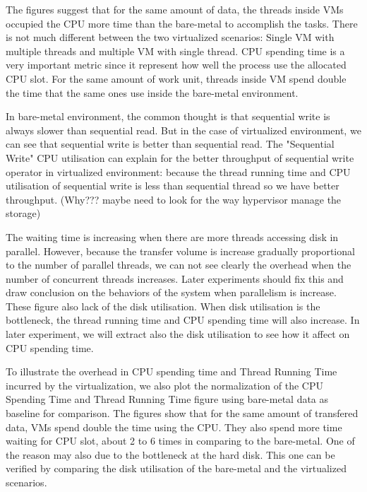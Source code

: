 \documentclass{acmsig}
\begin{document}
The figures suggest that for the same amount of data, the threads inside VMs occupied the CPU more time than the bare-metal to accomplish the tasks. There is not much different between the two virtualized scenarios: Single VM with multiple threads and multiple VM with single thread. CPU spending time is a very important metric since it represent how well the process use the allocated CPU slot. For the same amount of work unit, threads inside VM spend double the time that the same ones use inside the bare-metal environment.

In bare-metal environment, the common thought is that sequential write is always slower than sequential read. But in the case of virtualized environment, we can see that sequential write is better than sequential read. The "Sequential Write" CPU utilisation can explain for the better throughput of sequential write operator in virtualized environment: because the thread running time and CPU utilisation of sequential write is less than sequential thread so we have better throughput. (Why??? maybe need to look for the way hypervisor manage the storage)

The waiting time is increasing when there are more threads accessing disk in parallel. However, because the transfer volume is increase gradually proportional to the number of parallel threads, we can not see clearly the overhead when the number of concurrent threads increases. Later experiments should fix this and draw conclusion on the behaviors of the system when parallelism is increase. These figure also lack of the disk utilisation. When disk utilisation is the bottleneck, the thread running time and CPU spending time will also increase. In later experiment, we will extract also the disk utilisation to see how it affect on CPU spending time.


To illustrate the overhead in CPU spending time and Thread Running Time incurred by the virtualization, we also plot the normalization of the CPU Spending Time and Thread Running Time figure using bare-metal data as baseline for comparison. The figures show that for the same amount of transfered data, VMs spend double the time using the CPU. They also spend more time waiting for CPU slot, about 2 to 6 times in comparing to the bare-metal. One of the reason may also due to the bottleneck at the hard disk. This one can be verified by comparing the disk utilisation of the bare-metal and the virtualized scenarios.
\end{document}
